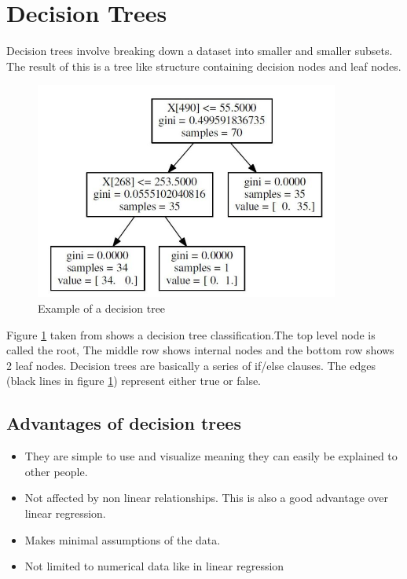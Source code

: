 \section{Decision Trees}

Decision trees involve breaking down a dataset into smaller and smaller subsets. The result of this is a tree like structure containing decision nodes and leaf nodes.

\begin{figure}[H]
  \centering
  \includegraphics[scale=0.5,width=100mm]{./images/decision-tree-example.jpg}
  \caption{Example of a decision tree}
  \label{fig:abalone-decision-tree}
\end{figure}

Figure \ref{fig:abalone-decision-tree} taken from \cite{decisionTreeExample} shows a decision tree classification.The top level node is called the root, The middle row shows internal nodes and the bottom row shows 2 leaf nodes. Decision trees are basically a series of if/else clauses. The edges (black lines in figure \ref{fig:abalone-decision-tree}) represent either true or false.

\subsection{Advantages of decision trees}

\begin{itemize}
  \item They are simple to use and visualize meaning they can easily be explained to other people.
  \item Not affected by non linear relationships. This is also a good advantage over linear regression.
  \item Makes minimal assumptions of the data.
  \item Not limited to numerical data like in linear regression
\end{itemize}

